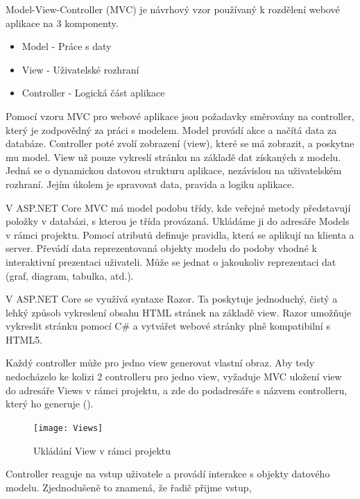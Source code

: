 \documentclass[a4paper, 12pt]{report}
\begin{document}
		Model-View-Controller (MVC) je návrhový vzor používaný k rozdělení webové aplikace na 3 komponenty.
		\begin{itemize}
			\item Model - Práce s daty
			\item View - Uživatelské rozhraní
			\item Controller - Logická část aplikace
		\end{itemize}\par
		Pomocí vzoru MVC pro webové aplikace jsou požadavky směrovány na controller, který je zodpovědný za práci s modelem. Model provádí akce a načítá
        data za databáze. Controller poté zvolí zobrazení (view), které se má zobrazit, a poskytne mu model. View už pouze vykreslí stránku na základě
        dat získaných z modelu.\cite{MVC}
				Jedná se o dynamickou datovou strukturu aplikace, nezávislou na uživatelském rozhraní. Jejím úkolem je spravovat data, pravida a logiku
                aplikace.\par
				V ASP.NET Core MVC má model podobu třídy, kde veřejné metody představují položky v databázi, s kterou je třída provázaná. Ukládáme ji
                do adresáře Models v rámci projektu. Pomocí atributů definuje pravidla, která se aplikují na klienta a server.\cite{MVC_Wiki_EN}
				Převádí data reprezentovaná objekty modelu do podoby vhodné k interaktivní prezentaci uživateli.\cite{MVC_Wiki_CZ} Může se jednat
                o jakoukoliv reprezentaci dat (graf, diagram, tabulka, atd.).\par
				V ASP.NET Core se využívá syntaxe Razor. Ta poskytuje jednoduchý, čistý a lehký způsob vykreslení obsahu HTML stránek na základě view.
                Razor umožňuje vykreslit stránku pomocí C\# a vytvářet webové stránky plně kompatibilní s HTML5.\cite{MVC_Wiki_EN}\par
				Každý controller může pro jedno view generovat vlastní obraz. Aby tedy nedocházelo ke kolizi 2 controlleru pro jedno view, vyžaduje  MVC
                uložení view do adresáře Views v rámci projektu, a zde do podadresáře s názvem controlleru, který ho generuje ().
				\begin{figure}[H]
					\centering
					\texttt{[image: Views]}
					\caption{Ukládání View v rámci projektu}
					\label{Views}
				\end{figure}
				Controller reaguje na vstup uživatele a provádí interakce s objekty datového modelu. Zjednodušeně to znamená, že řadič přijme vstup,
\end{document}

